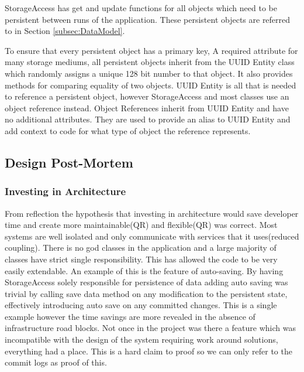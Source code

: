StorageAccess has get and update functions for all objects which need to be persistent between runs of the application. These persistent objects are referred to in Section \ref{subsec:DataModel}.

To ensure that every persistent object has a primary key, A required attribute for many storage mediums, all persistent objects inherit from the UUID Entity class which randomly assigns a unique 128 bit number to that object. It also provides methods for comparing equality of two objects. UUID Entity is all that is needed to reference a persistent object, however StorageAccess and most classes use an object reference instead. Object References inherit from UUID Entity and have no additional attributes. They are used to provide an alias to UUID Entity and add context to code for what type of object the reference represents.

\pagebreak

\subsection{Design Post-Mortem} \label{subsec:TechnicalDesignPost}
\subsubsection{Investing in Architecture}
From reflection the hypothesis that investing in architecture would save developer time and create more maintainable(QR) and flexible(QR) was correct. Most systems are well isolated and only communicate with services that it uses(reduced coupling). There is no god classes in the application and a large majority of classes have strict single responsibility. This has allowed the code to be very easily extendable. An example of this is the feature of auto-saving. By having StorageAccess solely responsible for persistence of data adding auto saving was trivial by calling save data method on any modification to the persistent state, effectively introducing auto save on any committed changes. This is a single example however the time savings are more revealed in the absence of infrastructure road blocks. Not once in the project was there a feature which was incompatible with the design of the system requiring work around solutions, everything had a place. This is a hard claim to proof so we can only refer to the commit logs as proof of this.

